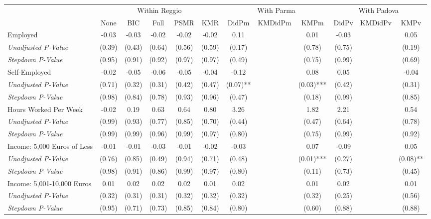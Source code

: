 \begin{tabular}{l c c c c c c c c c c c}
\toprule
& \multicolumn{5}{c}{Within Reggio} & \multicolumn{3}{c}{With Parma} & \multicolumn{3}{c}{With Padova} \\\cmidrule(lr){2-6} \cmidrule(lr){7-9} \cmidrule(lr){10-12}
 & None & BIC & Full & PSMR & KMR & DidPm & KMDidPm & KMPm & DidPv & KMDidPv & KMPv \\
\midrule
Employed & -0.03 & -0.03 & -0.02 & -0.02 & -0.02 & 0.11 & & 0.01 & -0.03 & & 0.05 \\
\quad \textit{Unadjusted P-Value} & (0.39) & (0.43) & (0.64) & (0.56) & (0.59) & (0.17) & & (0.78) & (0.75) & & (0.19) \\
\quad \textit{Stepdown P-Value} & (0.95) & (0.91) & (0.92) & (0.97) & (0.97) & (0.49) & & (0.75) & (0.99) & & (0.69) \\
Self-Employed & -0.02 & -0.05 & -0.06 & -0.05 & -0.04 & -0.12 & & 0.08 & 0.05 & & -0.04 \\
\quad \textit{Unadjusted P-Value} & (0.71) & (0.32) & (0.31) & (0.42) & (0.47) & (0.07)** & & (0.03)*** & (0.42) & & (0.31) \\
\quad \textit{Stepdown P-Value} & (0.98) & (0.84) & (0.78) & (0.93) & (0.96) & (0.47) & & (0.18) & (0.99) & & (0.85) \\
Hours Worked Per Week & -0.02 & 0.19 & 0.63 & 0.64 & 0.80 & 3.26 & & 1.82 & 2.21 & & 0.54 \\
\quad \textit{Unadjusted P-Value} & (0.99) & (0.93) & (0.77) & (0.85) & (0.70) & (0.44) & & (0.47) & (0.64) & & (0.78) \\
\quad \textit{Stepdown P-Value} & (0.99) & (0.99) & (0.96) & (0.99) & (0.97) & (0.80) & & (0.75) & (0.99) & & (0.92) \\
Income: 5,000 Euros of Less & -0.01 & -0.01 & -0.03 & -0.01 & -0.02 & -0.03 & & 0.07 & -0.09 & & 0.05 \\
\quad \textit{Unadjusted P-Value} & (0.76) & (0.85) & (0.49) & (0.94) & (0.71) & (0.48) & & (0.01)*** & (0.27) & & (0.08)** \\
\quad \textit{Stepdown P-Value} & (0.98) & (0.91) & (0.86) & (0.99) & (0.97) & (0.80) & & (0.11) & (0.73) & & (0.45) \\
Income: 5,001-10,000 Euros & 0.01 & 0.02 & 0.02 & 0.02 & 0.01 & 0.02 & & 0.01 & 0.02 & & 0.01 \\
\quad \textit{Unadjusted P-Value} & (0.32) & (0.31) & (0.31) & (0.32) & (0.32) & (0.32) & & (0.32) & (0.25) & & (0.56) \\
\quad \textit{Stepdown P-Value} & (0.95) & (0.71) & (0.73) & (0.85) & (0.84) & (0.80) & & (0.60) & (0.88) & & (0.88) \\

\end{tabular}
